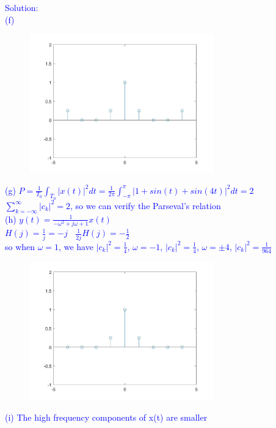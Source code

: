 \documentclass[12pt,a4paper]{article}
\begin{document}
\begin{tcolorbox}
\normalsize
\textcolor{blue}{Solution:\\
(f) 
\begin{figure}[H]
    \centering
    \includegraphics[width=8cm]{5f.jpg}
\end{figure}
(g) $P=\frac{1}{T_0}\int_{T_0}|x(t)|^2dt=\frac{1}{2\pi}\int_{-\pi}^\pi |1+sin(t)+sin(4t)|^2dt=2$\\
$\sum_{k=-\infty}^\infty|c_k|^2=2$, so we can verify the Parseval's relation\\
(h)
$ y(t)=\frac{1}{-\omega^{2}+j \omega+1} x(t)$\\
$H(j)=\frac{1}{j}=-j~~~~ \frac{1}{2 j} H(j)=-\frac{1}{2}$\\
so when $\omega=1$, we have $|c_{k}|^{2}=\frac{1}{4}$, $\omega=-1$, $|c_{k}|^{2}=\frac{1}{4}$, $\omega=\pm 4$, $|c_{k}|^{2}=\frac{1}{964}$
\begin{figure}[H]
    \centering
    \includegraphics[width=8cm]{5h.jpg}
\end{figure}
(i) The high frequency components of x(t) are smaller 
}
\end{tcolorbox}
\end{document}
